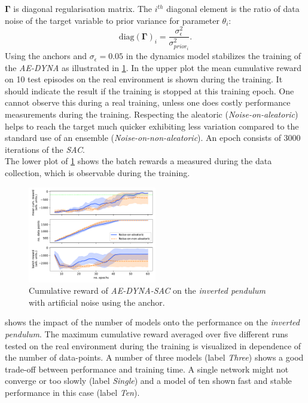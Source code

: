 \documentclass[
reprint,
amsmath,amssymb,amsfonts,clevref,
aps,
prstab,
]{revtex4-2}
\begin{document}
$\pmb{\Gamma}$ is diagonal regularisation matrix. The $i^{th}$ diagonal element is the ratio of data noise of the target variable to prior variance for parameter $\theta_i$:
\begin{equation}
	\label{eqn_anch_loss_init}
	\text{diag}(\pmb{\Gamma})_i = \frac{\sigma^2_\epsilon}{\sigma^2_{prior_i}}.
\end{equation}
	Using the anchors and $\sigma_\epsilon=0.05$ in the dynamics model stabilizes the training of the \emph{AE-DYNA} as illustrated in \cref{fig:comparsion_noise_ae_dyna}. In the upper plot the mean cumulative reward on 10 test episodes on the real environment is shown during the training. It should indicate the result if the training is stopped at this training epoch. One cannot observe this during a real training, unless one does costly performance measurements during the training. Respecting the aleatoric (\emph{Noise-on-aleatoric}) helps to reach the target much quicker exhibiting less variation compared to the standard use of an ensemble (\emph{Noise-on-non-aleatoric}). An epoch consists of 3000 iterations of the \emph{SAC}.\\
	The lower plot of \cref{fig:comparsion_noise_ae_dyna} shows the batch rewards a measured during the data collection, which is observable during the training.
	\begin{figure}[!h]
		\centering
		\includegraphics*[width=0.5\textwidth]{Figures/Comparison_noise_ae_dyna}
		\caption{Cumulative reward of \emph{AE-DYNA-SAC} on the \emph{inverted pendulum} with artificial noise using the anchor.}
		\label{fig:comparsion_noise_ae_dyna}
	\end{figure}
 shows the impact of the number of models onto the performance on the \emph{inverted pendulum}. The maximum cumulative reward averaged over five different runs tested on the real environment during the training is visualized in dependence of the number of data-points. A number of three models (label \emph{Three}) shows a good trade-off between performance and training time. A single network might not converge or too slowly (label \emph{Single}) and a model of ten shown fast and stable performance in this case (label \emph{Ten}).
\end{document}
